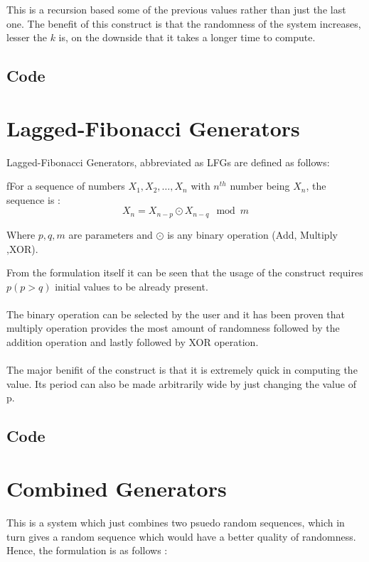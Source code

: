 \noindent This is a recursion based some of the previous 
values rather than just the last one. The benefit of this 
construct is that the randomness of the system increases, 
lesser the $k$ is, on the downside that it takes a longer 
time to compute.

\subsection{Code}


\section{Lagged-Fibonacci Generators}
Lagged-Fibonacci Generators, abbreviated as LFGs are 
defined as follows:

\begin{definition}
    fFor a sequence of numbers $X_1,X_2, \dots, X_n $ with 
    $n^{th}$ number being $X_n$, 
    the sequence is :\\
    \begin{equation*}
        X_n = X_{n-p} \odot X_{n-q} \mod m
    \end{equation*}

    \noindent Where $p,q,m$ are parameters and $\odot$ is 
    any binary operation (Add, Multiply ,XOR).
\end{definition}

\noindent From the formulation itself it can be seen that 
the usage of the construct requires $p (p > q)$ initial values 
to be already present.
\\\\
The binary operation can be selected by the user and it has 
been proven that multiply operation provides the most amount 
of randomness followed by the addition operation and lastly 
followed by XOR operation.
\\\\
The major benifit of the construct is that it is extremely 
quick in computing the value. Its period can also be made 
arbitrarily wide by just changing the value of p.

\subsection{Code}


\section{Combined Generators}
This is a system which just combines two psuedo 
random sequences, which in turn gives a random sequence 
which would have a better quality of randomness. 
Hence, the formulation is as follows :

